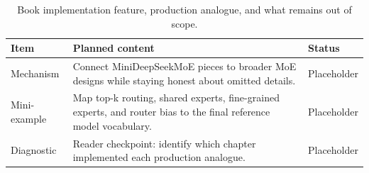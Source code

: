 \begin{table}[H]
\centering
\caption{Book implementation feature, production analogue, and what remains out of scope.}
\label{tab:ch12-mapping-the-book-model-to-production-moe-families}
\begin{tabularx}{\textwidth}{p{}X p{}}
\toprule
Item & Planned content & Status \\
\midrule
Mechanism & Connect MiniDeepSeekMoE pieces to broader MoE designs while staying honest about omitted details. & Placeholder \\
Mini-example & Map top-k routing, shared experts, fine-grained experts, and router bias to the final reference model vocabulary. & Placeholder \\
Diagnostic & Reader checkpoint: identify which chapter implemented each production analogue. & Placeholder \\
\bottomrule
\end{tabularx}
\end{table}
